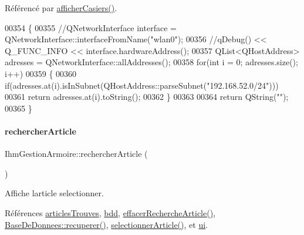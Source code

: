 Référencé par \hyperlink{class_ihm_gestion_armoire_a04201173bd9ac135227ac56a6c22a999}{afficher\+Casiers()}.


\begin{DoxyCode}
00354 \{
00355     \textcolor{comment}{//QNetworkInterface interface = QNetworkInterface::interfaceFromName("wlan0");}
00356     \textcolor{comment}{//qDebug() << Q\_FUNC\_INFO << interface.hardwareAddress();}
00357     QList<QHostAddress> adresses = QNetworkInterface::allAddresses();
00358     \textcolor{keywordflow}{for}(\textcolor{keywordtype}{int} i = 0; adresses.size(); i++)
00359     \{
00360         \textcolor{keywordflow}{if}(adresses.at(i).isInSubnet(QHostAddress::parseSubnet(\textcolor{stringliteral}{"192.168.52.0/24"})))
00361             \textcolor{keywordflow}{return} adresses.at(i).toString();
00362     \}
00363 
00364     \textcolor{keywordflow}{return} QString(\textcolor{stringliteral}{""});
00365 \}
\end{DoxyCode}
\mbox{\label{class_ihm_gestion_armoire_a594f25b58b70700e19e3e7f567325c40}} 
\paragraph{\texorpdfstring{rechercher\+Article}{rechercherArticle}}
{\footnotesize\ttfamily Ihm\+Gestion\+Armoire\+::rechercher\+Article (\begin{DoxyParamCaption}{ }\end{DoxyParamCaption})\hspace{0.3cm}{\ttfamily [slot]}}

Affiche l\textquotesingle{}article selectionner. 

Références \hyperlink{class_ihm_gestion_armoire_a21821dc4f15d87125efb933991eb4385}{articles\+Trouves}, \hyperlink{class_ihm_gestion_armoire_ad0d3a89bbcfa9f0e50ff5c50ec64d707}{bdd}, \hyperlink{class_ihm_gestion_armoire_a71c12ea50f463c14c835b02d3db22025}{effacer\+Recherche\+Article()}, \hyperlink{class_base_de_donnees_a77539baad389f5acf754cd2cd452403e}{Base\+De\+Donnees\+::recuperer()}, \hyperlink{class_ihm_gestion_armoire_a28970b692994ad7201c03decd42ec0e5}{selectionner\+Article()}, et \hyperlink{class_ihm_gestion_armoire_a793a2816dc21b3161566138d2af5a8b9}{ui}.



